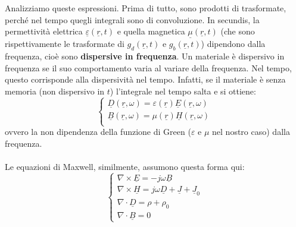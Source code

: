 \documentclass{book}
\begin{document}
        Analizziamo queste espressioni. Prima di tutto, sono prodotti di trasformate, perché nel tempo quegli integrali sono di convoluzione. In secundis, la permettività elettrica $\underline{\varepsilon}(\underline{r},t)$ e quella magnetica $\underline{\mu}(\underline{r},t)$ (che sono rispettivamente le trasformate di $g_{d}(\underline{r},t)$ e $g_{b}(\underline{r},t)$) dipendono dalla frequenza, cioè sono \textbf{dispersive in frequenza}. Un materiale è dispersivo in frequenza se il suo comportamento varia al variare della frequenza. Nel tempo, questo corrisponde alla dispersività nel tempo. Infatti, se il materiale è senza memoria (non dispersivo in $t$) l'integrale nel tempo salta e si ottiene:
        \begin{equation}
            \begin{cases}
            
            \underline{D}(\underline{r},\omega) = \varepsilon (\underline{r}) \underline{E}(\underline{r}, \omega) \\
            
            \underline{B}(\underline{r} ,\omega) = \mu ( \underline{r})\underline{H}(\underline{r}, \omega) \\
            
            \end{cases}
        \end{equation}
        ovvero la non dipendenza della funzione di Green ($\varepsilon$ e $\mu$ nel nostro caso) dalla frequenza. \\ \\
        Le equazioni di Maxwell, similmente, assumono questa forma qui:
        \begin{equation}
            \begin{cases}
            \nabla \times \underline{E} = - j \omega \underline{B} \\
            \nabla \times \underline{H} = j \omega \underline{D} + \underline{J} + \underline{J}_{0} \\
            \nabla \cdot \underline{D} = \rho + \rho_{0} \\
            \nabla \cdot \underline{B} = 0
            \end{cases}
        \end{equation}
\end{document}
